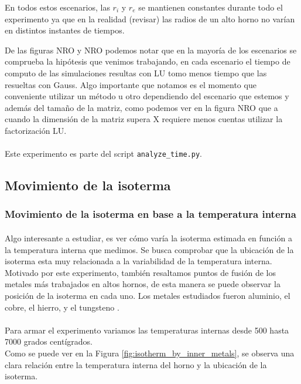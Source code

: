 \documentclass[12pt]{article}
\begin{document}
En todos estos escenarios, las $r_{i}$ y $r_{e}$ se mantienen constantes durante todo el experimento ya que en la realidad (revisar) las radios de un alto horno no varían en distintos instantes de tiempos. 

De las figuras NRO y NRO podemos notar que en la mayoría de los escenarios se comprueba la hipótesis que venimos trabajando, en cada escenario el tiempo de computo de las simulaciones resultas con LU tomo menos tiempo que las resueltas con Gauss. Algo importante que notamos es el momento que conveniente utilizar un método u otro dependiendo del escenario que estemos y además del tamaño de la matriz, como podemos ver en la figura NRO que a cuando la dimensión de la matriz supera X requiere menos cuentas utilizar la factorización LU.


\paragraph{} Este experimento es parte del script \texttt{analyze\_time.py}.

\subsection{Movimiento de la isoterma}

\subsubsection{Movimiento de la isoterma en base a la temperatura interna}

\paragraph{} Algo interesante a estudiar, es ver cómo varía la isoterma estimada en función a la temperatura interna que medimos. Se busca comprobar que la ubicación de la isoterma esta muy relacionada a la variabilidad de la temperatura interna. Motivado por este experimento, también resaltamos puntos de fusión de los metales más trabajados en altos hornos, de esta manera se puede observar la posición de la isoterma en cada uno. Los metales estudiados fueron aluminio, el cobre, el hierro, y el tungsteno \cite{big:metales}. 
\paragraph{} Para armar el experimento variamos las temperaturas internas desde 500 hasta 7000 grados centígrados. \\
Como se puede ver en la Figura \ref{fig:isotherm_by_inner_metals}, se observa una clara relación entre la temperatura interna del horno y la ubicación de la isoterma. 
\end{document}
